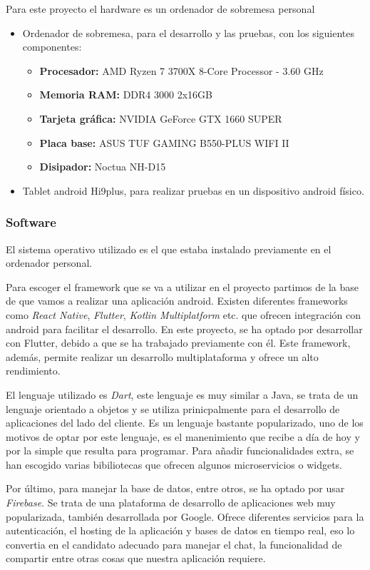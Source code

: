 \documentclass[a4paper, 12pt]{article}
\begin{document}
Para este proyecto el hardware es un ordenador de sobremesa personal

\begin{itemize}
	\item Ordenador de sobremesa, para el desarrollo y las pruebas, con los siguientes componentes:
		\begin{itemize}
			\item \textbf{Procesador:} AMD Ryzen 7 3700X 8-Core Processor - 3.60 GHz
			\item \textbf{Memoria RAM:} DDR4 3000 2x16GB
			\item \textbf{Tarjeta gráfica:} NVIDIA GeForce GTX 1660 SUPER
			\item \textbf{Placa base:} ASUS TUF GAMING B550-PLUS WIFI II
			\item \textbf{Disipador:} Noctua NH-D15
		\end{itemize}
	\item Tablet android Hi9plus, para realizar pruebas en un dispositivo android físico.
\end{itemize}

\subsubsection{Software}

El sistema operativo utilizado es el que estaba instalado previamente en el ordenador personal.

Para escoger el framework que se va a utilizar en el proyecto partimos de la base de que vamos a realizar una aplicación android. Existen diferentes frameworks como \textit{React Native}, \textit{Flutter}, \textit{Kotlin Multiplatform} etc. que ofrecen integración con android para facilitar el desarrollo. En este proyecto, se ha optado por desarrollar con Flutter, debido a que se ha trabajado previamente con él. Este framework, además, permite realizar un desarrollo multiplataforma y ofrece un alto rendimiento. 

El lenguaje utilizado es \textit{Dart}, este lenguaje es muy similar a Java, se trata de un lenguaje orientado a objetos y se utiliza prinicpalmente para el desarrollo de aplicaciones del lado del cliente. Es un lenguaje bastante popularizado, uno de los motivos de optar por este lenguaje, es el manenimiento que recibe a día de hoy y por la simple que resulta para programar. Para añadir funcionalidades extra, se han escogido varias bibiliotecas que ofrecen algunos microservicios o widgets.

Por último, para manejar la base de datos, entre otros, se ha optado por usar \textit{Firebase}. Se trata de una plataforma de desarrollo de aplicaciones web muy popularizada, también desarrollada por Google. Ofrece diferentes servicios para la autenticación, el hosting de la aplicación y bases de datos en tiempo real, eso lo convertia en el candidato adecuado para manejar el chat, la funcionalidad de compartir entre otras cosas que nuestra aplicación requiere.
\end{document}
